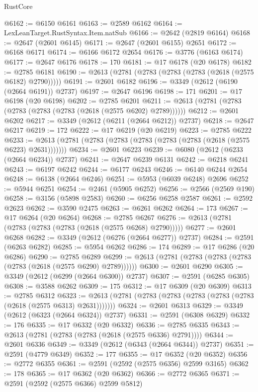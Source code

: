\begin{lexlean}{RustCore}
\begin{coremodule}
@6162 := @6150 @6161
@6163 := @2589 @6162
@6164 := LexLeanTarget.RustSyntax.Item.natSub
@6166 := @2642 (@2819 @6164)
@6168 := @2647 (@2601 @6145)
@6171 := @2647 (@2601 @6155) @2651
@6172 := @6168 @6171
@6174 := @6166 @6172 @2654
@6176 := @3776 (@6163 @6174)
@6177 := @2647 @6176
@6178 := 170
@6181 := @17 @6178 (@20 @6178)
@6182 := @2785 @6181
@6190 := @2613 (@2781 (@2783 (@2783 (@2783 (@2618 (@2575 @6182) @2790)))))
@6191 := @2601 @6182
@6196 := @3349 (@2612 (@6190 (@2664 @6191)) @2737)
@6197 := @2647 @6196
@6198 := 171
@6201 := @17 @6198 (@20 @6198)
@6202 := @2785 @6201
@6211 := @2613 (@2781 (@2783 (@2783 (@2783 (@2783 (@2618 (@2575 @6202) @2789))))))
@6212 := @2601 @6202
@6217 := @3349 (@2612 (@6211 (@2664 @6212)) @2737)
@6218 := @2647 @6217
@6219 := 172
@6222 := @17 @6219 (@20 @6219)
@6223 := @2785 @6222
@6233 := @2613 (@2781 (@2783 (@2783 (@2783 (@2783 (@2783 (@2618 (@2575 @6223) @2631)))))))
@6234 := @2601 @6223
@6239 := @6080 (@2612 (@6233 (@2664 @6234)) @2737)
@6241 := @2647 @6239 @6131
@6242 := @6218 @6241
@6243 := @6197 @6242
@6244 := @6177 @6243
@6246 := @6140 @6244 @2654
@6248 := @6138 (@2664 @6246)
@6251 := @5953 (@6039 @6248) @2696
@6252 := @5944 @6251
@6254 := @2461 (@5905 @6252)
@6256 := @2566 (@2569 @190)
@6258 := @3156 (@5898 @2583)
@6260 := @6256 @6258 @2587
@6261 := @2592 @2623
@6262 := @3590 @2475
@6263 := @6261 @6262
@6264 := 173
@6267 := @17 @6264 (@20 @6264)
@6268 := @2785 @6267
@6276 := @2613 (@2781 (@2783 (@2783 (@2783 (@2618 (@2575 @6268) @2790)))))
@6277 := @2601 @6268
@6282 := @3349 (@2612 (@6276 (@2664 @6277)) @2737)
@6284 := @2591 (@6263 @6282)
@6285 := @5954 @6262
@6286 := 174
@6289 := @17 @6286 (@20 @6286)
@6290 := @2785 @6289
@6299 := @2613 (@2781 (@2783 (@2783 (@2783 (@2783 (@2618 (@2575 @6290) @2789))))))
@6300 := @2601 @6290
@6305 := @3349 (@2612 (@6299 (@2664 @6300)) @2737)
@6307 := @2591 (@6285 @6305)
@6308 := @3588 @6262
@6309 := 175
@6312 := @17 @6309 (@20 @6309)
@6313 := @2785 @6312
@6323 := @2613 (@2781 (@2783 (@2783 (@2783 (@2783 (@2783 (@2618 (@2575 @6313) @2631)))))))
@6324 := @2601 @6313
@6329 := @3349 (@2612 (@6323 (@2664 @6324)) @2737)
@6331 := @2591 (@6308 @6329)
@6332 := 176
@6335 := @17 @6332 (@20 @6332)
@6336 := @2785 @6335
@6343 := @2613 (@2781 (@2783 (@2783 (@2618 (@2575 @6336) @2791))))
@6344 := @2601 @6336
@6349 := @3349 (@2612 (@6343 (@2664 @6344)) @2737)
@6351 := @2591 (@4779 @6349)
@6352 := 177
@6355 := @17 @6352 (@20 @6352)
@6356 := @2772 @6355
@6361 := @2591 (@2592 (@2575 @6356) @2599 @3165)
@6362 := 178
@6365 := @17 @6362 (@20 @6362)
@6366 := @2772 @6365
@6371 := @2591 (@2592 (@2575 @6366) @2599 @5812)

\end{coremodule}
\end{lexlean}
